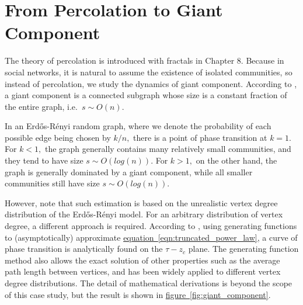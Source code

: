 \documentclass[11pt,a4paper]{article}
\newcommand{\ER}{Erd\H{o}s-R\'{e}nyi }
\begin{document}
\section{From Percolation to Giant Component}

The theory of percolation is introduced with fractals in Chapter 8. Because in social networks, it is natural to assume the existence of isolated communities, so instead of percolation, we study the dynamics of giant component. According to \cite{wiki_giant_component}, a giant component is a connected subgraph whose size is a constant fraction of the entire graph, i.e.\ $s\sim O(n).$

In an \ER random graph, where we denote the probability of each possible edge being chosen by $k/n,$ there is a point of phase transition at $k=1.$ For $k<1,$ the graph generally contains many relatively small communities, and they tend to have size $s\sim O(log(n)).$ For $k>1,$ on the other hand, the graph is generally dominated by a giant component, while all smaller communities still have size $s\sim O(log(n)).$

However, note that such estimation is based on the unrealistic vertex degree distribution of the \ER model. For an arbitrary distribution of vertex degree, a different approach is required. According to \cite{newman2002random}, using generating functions to (asymptotically) approximate \hyperref[eqn:truncated_power_law]{equation~\ref{eqn:truncated_power_law}}, a curve of phase transition is analytically found on the $\tau-z_c$ plane. The generating function method also allows the exact solution of other properties such as the average path length between vertices, and has been widely applied to different vertex degree distributions. The detail of mathematical derivations is beyond the scope of this case study, but the result is shown in \hyperref[fig:giant_component]{figure~\ref{fig:giant_component}}.
\end{document}
